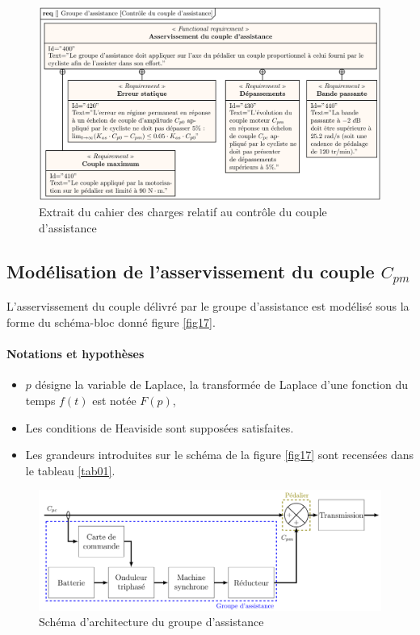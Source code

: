 \begin{figure}[ht!]
\begin{center}
\includegraphics[width=.95\linewidth]{img/fig15}
\caption{\label{fig15}Extrait du cahier des charges relatif au contrôle du couple d’assistance}
\end{center}
\end{figure}

\newpage

\subsection{Modélisation de l’asservissement du couple $C_{pm}$}

L’asservissement du couple délivré par le groupe d’assistance est modélisé sous la forme du schéma-bloc
donné figure \ref{fig17}.

\paragraph{Notations et hypothèses}
\begin{itemize}
 \item $p$ désigne la variable de Laplace, la transformée de Laplace d’une fonction du temps $f(t)$ est notée $F(p)$,
 \item Les conditions de Heaviside sont supposées satisfaites.
 \item Les grandeurs introduites sur le schéma de la figure \ref{fig17} sont recensées dans le tableau \ref{tab01}.
\end{itemize}

\begin{figure}[ht!]
\begin{center}
\includegraphics[width=.9\linewidth]{img/fig16}
\caption{\label{fig16}Schéma d’architecture du groupe d’assistance}
\end{center}
\end{figure}

